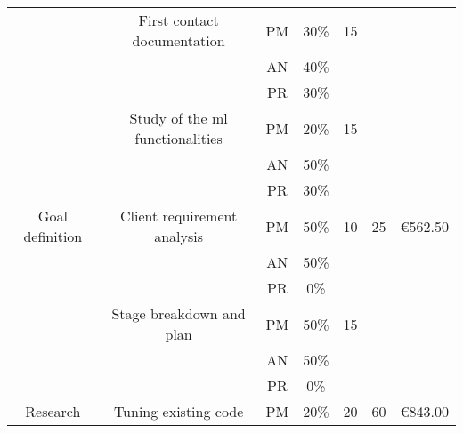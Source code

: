 \begin{table}[p]
\begin{center}
{\begin{tabular}{|c|l|c|c|l|l|l|}
\multicolumn{ 1}{|c|}{} & \multicolumn{ 1}{c|}{First contact documentation} & PM & 30\% & \multicolumn{ 1}{c|}{15} & \multicolumn{ 1}{l|}{} & \multicolumn{ 1}{l|}{} \\ \cline{ 3- 4}
\multicolumn{ 1}{|c|}{} & \multicolumn{ 1}{l|}{} & AN & 40\% & \multicolumn{ 1}{l|}{} & \multicolumn{ 1}{l|}{} & \multicolumn{ 1}{l|}{} \\ \cline{ 3- 4}
\multicolumn{ 1}{|c|}{} & \multicolumn{ 1}{l|}{} & PR & 30\% & \multicolumn{ 1}{l|}{} & \multicolumn{ 1}{l|}{} & \multicolumn{ 1}{l|}{} \\ \cline{ 2- 5}
\multicolumn{ 1}{|c|}{} & \multicolumn{ 1}{c|}{Study of the ml functionalities} & PM & 20\% & \multicolumn{ 1}{c|}{15} & \multicolumn{ 1}{l|}{} & \multicolumn{ 1}{l|}{} \\ \cline{ 3- 4}
\multicolumn{ 1}{|c|}{} & \multicolumn{ 1}{l|}{} & AN & 50\% & \multicolumn{ 1}{l|}{} & \multicolumn{ 1}{l|}{} & \multicolumn{ 1}{l|}{} \\ \cline{ 3- 4}
\multicolumn{ 1}{|c|}{} & \multicolumn{ 1}{l|}{} & PR & 30\% & \multicolumn{ 1}{l|}{} & \multicolumn{ 1}{l|}{} & \multicolumn{ 1}{l|}{} \\ \hline
\multicolumn{ 1}{|c|}{Goal definition} & \multicolumn{ 1}{c|}{Client requirement analysis} & PM & 50\% & \multicolumn{ 1}{c|}{10} & \multicolumn{ 1}{c|}{25} & \multicolumn{ 1}{c|}{\textgreek{\euro}562.50} \\ \cline{ 3- 4}
\multicolumn{ 1}{|c|}{} & \multicolumn{ 1}{l|}{} & AN & 50\% & \multicolumn{ 1}{l|}{} & \multicolumn{ 1}{l|}{} & \multicolumn{ 1}{l|}{} \\ \cline{ 3- 4}
\multicolumn{ 1}{|c|}{} & \multicolumn{ 1}{l|}{} & PR & 0\% & \multicolumn{ 1}{l|}{} & \multicolumn{ 1}{l|}{} & \multicolumn{ 1}{l|}{} \\ \cline{ 2- 5}
\multicolumn{ 1}{|c|}{} & \multicolumn{ 1}{c|}{Stage breakdown and plan} & PM & 50\% & \multicolumn{ 1}{c|}{15} & \multicolumn{ 1}{l|}{} & \multicolumn{ 1}{l|}{} \\ \cline{ 3- 4}
\multicolumn{ 1}{|c|}{} & \multicolumn{ 1}{l|}{} & AN & 50\% & \multicolumn{ 1}{l|}{} & \multicolumn{ 1}{l|}{} & \multicolumn{ 1}{l|}{} \\ \cline{ 3- 4}
\multicolumn{ 1}{|c|}{} & \multicolumn{ 1}{l|}{} & PR & 0\% & \multicolumn{ 1}{l|}{} & \multicolumn{ 1}{l|}{} & \multicolumn{ 1}{l|}{} \\ \hline
\multicolumn{ 1}{|c|}{Research} & \multicolumn{ 1}{c|}{Tuning existing code} & PM & 20\% & \multicolumn{ 1}{c|}{20} & \multicolumn{ 1}{c|}{60} & \multicolumn{ 1}{c|}{\textgreek{\euro}843.00} \\ \cline{ 3- 4}

\end{tabular}}
\end{center}
\end{table}
